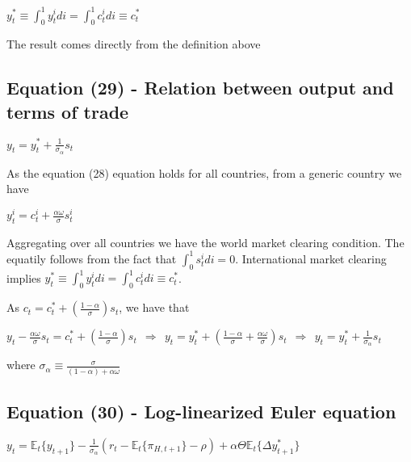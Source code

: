 \documentclass[
]{article}
\begin{document}
\(\displaystyle y_t^* \equiv \int_0^1y_t^i di=\int_0^1 c_t^i di \equiv c_t^*\)

\vspace{8pt}

The result comes directly from the definition above

\vspace{12pt}

\hypertarget{equation-29---relation-between-output-and-terms-of-trade}{%
\subsection{Equation (29) - Relation between output and terms of
trade}\label{equation-29---relation-between-output-and-terms-of-trade}}

\(\displaystyle y_t = y_t^* + \frac{1}{\sigma_\alpha}s_t\)

\vspace{8pt}

As the equation (28) equation holds for all countries, from a generic
country we have

\(\displaystyle y_t^i=c_t^i+ \frac{\alpha \omega}{\sigma} s_t^i\)

Aggregating over all countries we have the world market clearing
condition. The equatily follows from the fact that
\(\int_0^1 s_t^i di =0\). International market clearing implies
\(y_t^* \equiv \int_0^1y_t^idi = \int_0^1c_t^idi \equiv c_t^*\).

As
\(\displaystyle c_t = c_t^* + \left(\frac{1-\alpha}{\sigma} \right)s_t\),
we have that

\(\displaystyle y_t - \frac{\alpha \omega}{\sigma}s_t = c_t^* + \left(\frac{1-\alpha}{\sigma} \right)s_t \ \ \Rightarrow \ \ y_t = y_t^* + \left(\frac{1-\alpha}{\sigma} + \frac{\alpha \omega}{\sigma} \right)s_t \ \ \Rightarrow \ \ y_t = y_t^* + \frac{1}{\sigma_\alpha}s_t\)

where
\(\displaystyle \sigma_\alpha \equiv \frac{\sigma}{(1-\alpha)+ \alpha \omega}\)

\vspace{12pt}

\hypertarget{equation-30---log-linearized-euler-equation}{%
\subsection{Equation (30) - Log-linearized Euler
equation}\label{equation-30---log-linearized-euler-equation}}

\(\displaystyle y_t= \mathbb{E}_t\{y_{t+1}\} -\frac{1}{\sigma_\alpha}(r_t-\mathbb{E}_t\{\pi_{H,t+1}\} -\rho)+ \alpha \Theta \mathbb{E}_t\{\Delta y_{t+1}^*\}\)
\end{document}
